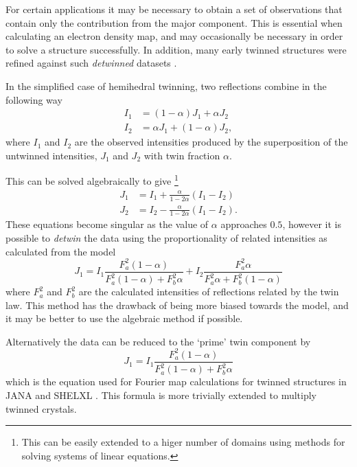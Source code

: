 \documentclass[pdf]{iucr}
\begin{document}
For certain applications it may be necessary to obtain a set of observations that contain only the contribution from the major component. This is essential when calculating an electron density map, and may occasionally be necessary in order to solve a structure successfully. In addition, many early twinned structures were refined against such \emph{detwinned} datasets \cite{Grainger:a06498,Murray-Rust:a10328,Britton:a08682}.

In the simplified case of hemihedral twinning, two reflections combine in the following way 
\begin{align}
I_1 &= (1 - \alpha) J_1 + \alpha J_2 \\
I_2 &= \alpha J_1 + (1- \alpha) J_2
\label{eqn:twin_frac}
,
\end{align}
where $I_1$ and $I_2$ are the observed intensities produced by the superposition of the untwinned intensities, $J_1$ and $J_2$ with twin fraction $\alpha$.

This can be solved algebraically \cite{Britton:a08682,Grainger:a06498,Zachariasen:a04610} to give
\footnote{This can be easily extended to a higer number of domains using methods for solving systems of linear equations.}
\begin{align}
J_1 &= I_1 + \frac{\alpha}{1 - 2 \alpha} (I_1 - I_2) \\
J_2 &= I_2 - \frac{\alpha}{1 - 2 \alpha} (I_1 - I_2)
.
\label{eqn:detwin_alg}
\end{align}
These equations become singular as the value of $\alpha$ approaches $0.5$, however it is possible to \emph{detwin} the data using the proportionality of related intensities as calculated from the model
\begin{equation}
J_1 = I_1 \frac{F_a^2 (1 - \alpha)}{F_a^2 (1 - \alpha) + F_b^2 \alpha} + I_2 \frac{F_a^2 \alpha}{F_a^2 \alpha + F_b^2 (1 - \alpha)}
\label{eqn:detwin_prop}
\end{equation}
where $F_a^2$ and $F_b^2$ are the calculated intensities of reflections related by the twin law. This method has the drawback of being more biased towards the model, and it may be better to use the algebraic method if possible.

Alternatively the data can be reduced to the `prime' twin component by
\begin{equation}
J_1 = I_1 \frac{F_a^2 (1 - \alpha)}{F_a^2 (1 - \alpha) + F_b^2 \alpha}
\label{eqn:detwin_prime}
\end{equation}
which is the equation used for Fourier map calculations for twinned structures in JANA \cite{JANA:man98,Dusek:hn0119} and SHELXL \cite{SHELX:man97}. This formula is more trivially extended to multiply twinned crystals.
\end{document}
